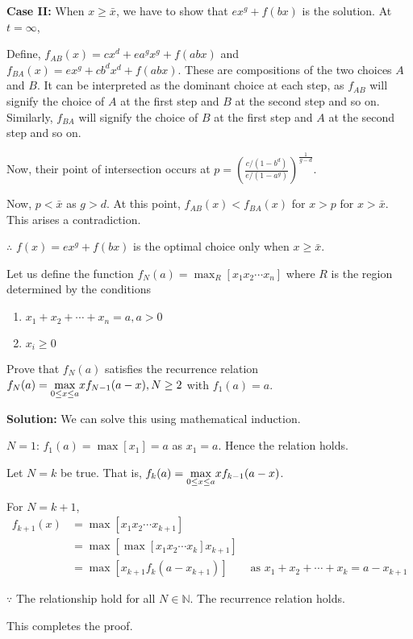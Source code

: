\begin{example}
\vspace{4mm}
\textbf{Case II:} When $x \ge \bar{x}$, we have to show that $ex^g + f(bx)$ is the solution. At $t=\infty$,

Define, $f_{AB} (x) = cx^d + ea^gx^g + f(abx)$ and $f_{BA} (x) = ex^g + cb^dx^d + f(abx)$. These are compositions of the two choices $A$ and $B$. It can be interpreted as the dominant choice at each step, as $f_{AB}$ will signify the choice of $A$ at the first step and $B$ at the second step and so on. Similarly, $f_{BA}$ will signify the choice of $B$ at the first step and $A$ at the second step and so on.

Now, their point of intersection occurs at $p = {\left(\frac{c/(1-b^d)}{e/(1-a^g)}\right)^{\frac{1}{g-d}}}$.

Now, $p < \bar{x}$ as $g > d$. At this point, $f_{AB} (x) < f_{BA} (x)$ for $x > p$ for $x > \bar{x}$. This arises a contradiction. 

$\therefore$ $f(x) = ex^g + f(bx)$ is the optimal choice only when $x \ge \bar{x}$.
\end{example}

\vspace{0.8cm}
\begin{example} Let us define the function $f_N(a) = \max_R [x_1 x_2 \cdots x_n] $ where $R$ is the region determined by the conditions
    \begin{enumerate}
        \item $x_1 + x_2 + \cdots + x_n = a, a > 0$
        \item $x_i \ge 0$
    \end{enumerate}
Prove that $f_N(a)$ satisfies the recurrence relation $f_N(a) = \mathlarger{\max_{0 \le x \le a}} xf_{N-1}(a-x), N \ge 2$ with $f_1(a) = a$.

\vspace{5mm}
\textbf{Solution:} We can solve this using mathematical induction.

{$N=1$:} $f_1(a) = \max[x_1] = a$ as $x_1 = a$. Hence the relation holds.

{Let $N=k$} be true. That is, $f_k(a) = \mathlarger{\max_{0 \le x \le a}} xf_{k-1}(a-x)$.

{For $N=k+1$}, 
\begin{align*}
    f_{k+1}(x) &= \max[x_1 x_2 \cdots x_{k+1}] \\
               &= \max[\max[x_1 x_2 \cdots x_k] x_{k+1}] \\
               &= \max[x_{k+1}f_k(a-x_{k+1})] & \text{ as } x_1 + x_2+ \cdots + x_k = a-x_{k+1}
\end{align*}

$\because$ The relationship hold for all $N \in \mathbb{N}$. The recurrence relation holds.

This completes the proof.
\end{example}

